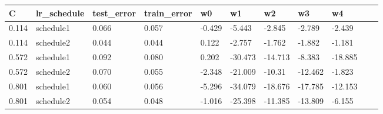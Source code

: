 \begin{tabular}{lllllllllll}
\toprule
C & lr_schedule & test_error & train_error & w0 & w1 & w2 & w3 & w4 \\
\midrule
0.114 & schedule1 & 0.066 & 0.057 & -0.429 & -5.443 & -2.845 & -2.789 & -2.439 \\
0.114 & schedule2 & 0.044 & 0.044 & 0.122 & -2.757 & -1.762 & -1.882 & -1.181 \\
0.572 & schedule1 & 0.092 & 0.080 & 0.202 & -30.473 & -14.713 & -8.383 & -18.885 \\
0.572 & schedule2 & 0.070 & 0.055 & -2.348 & -21.009 & -10.31 & -12.462 & -1.823 \\
0.801 & schedule1 & 0.060 & 0.056 & -5.296 & -34.079 & -18.676 & -17.785 & -12.153 \\
0.801 & schedule2 & 0.054 & 0.048 & -1.016 & -25.398 & -11.385 & -13.809 & -6.155 \\
\bottomrule
\end{tabular}
